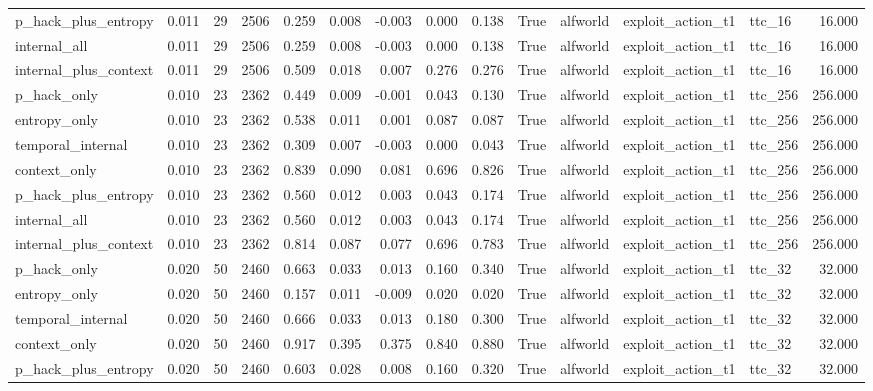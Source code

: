 \begin{tabular}{lrrrrrrrrrlllr}
p_hack_plus_entropy & 0.011 & 29 & 2506 & 0.259 & 0.008 & -0.003 & 0.000 & 0.138 & True & alfworld & exploit_action_t1 & ttc_16 & 16.000 \\
internal_all & 0.011 & 29 & 2506 & 0.259 & 0.008 & -0.003 & 0.000 & 0.138 & True & alfworld & exploit_action_t1 & ttc_16 & 16.000 \\
internal_plus_context & 0.011 & 29 & 2506 & 0.509 & 0.018 & 0.007 & 0.276 & 0.276 & True & alfworld & exploit_action_t1 & ttc_16 & 16.000 \\
p_hack_only & 0.010 & 23 & 2362 & 0.449 & 0.009 & -0.001 & 0.043 & 0.130 & True & alfworld & exploit_action_t1 & ttc_256 & 256.000 \\
entropy_only & 0.010 & 23 & 2362 & 0.538 & 0.011 & 0.001 & 0.087 & 0.087 & True & alfworld & exploit_action_t1 & ttc_256 & 256.000 \\
temporal_internal & 0.010 & 23 & 2362 & 0.309 & 0.007 & -0.003 & 0.000 & 0.043 & True & alfworld & exploit_action_t1 & ttc_256 & 256.000 \\
context_only & 0.010 & 23 & 2362 & 0.839 & 0.090 & 0.081 & 0.696 & 0.826 & True & alfworld & exploit_action_t1 & ttc_256 & 256.000 \\
p_hack_plus_entropy & 0.010 & 23 & 2362 & 0.560 & 0.012 & 0.003 & 0.043 & 0.174 & True & alfworld & exploit_action_t1 & ttc_256 & 256.000 \\
internal_all & 0.010 & 23 & 2362 & 0.560 & 0.012 & 0.003 & 0.043 & 0.174 & True & alfworld & exploit_action_t1 & ttc_256 & 256.000 \\
internal_plus_context & 0.010 & 23 & 2362 & 0.814 & 0.087 & 0.077 & 0.696 & 0.783 & True & alfworld & exploit_action_t1 & ttc_256 & 256.000 \\
p_hack_only & 0.020 & 50 & 2460 & 0.663 & 0.033 & 0.013 & 0.160 & 0.340 & True & alfworld & exploit_action_t1 & ttc_32 & 32.000 \\
entropy_only & 0.020 & 50 & 2460 & 0.157 & 0.011 & -0.009 & 0.020 & 0.020 & True & alfworld & exploit_action_t1 & ttc_32 & 32.000 \\
temporal_internal & 0.020 & 50 & 2460 & 0.666 & 0.033 & 0.013 & 0.180 & 0.300 & True & alfworld & exploit_action_t1 & ttc_32 & 32.000 \\
context_only & 0.020 & 50 & 2460 & 0.917 & 0.395 & 0.375 & 0.840 & 0.880 & True & alfworld & exploit_action_t1 & ttc_32 & 32.000 \\
p_hack_plus_entropy & 0.020 & 50 & 2460 & 0.603 & 0.028 & 0.008 & 0.160 & 0.320 & True & alfworld & exploit_action_t1 & ttc_32 & 32.000 \\

\end{tabular}
